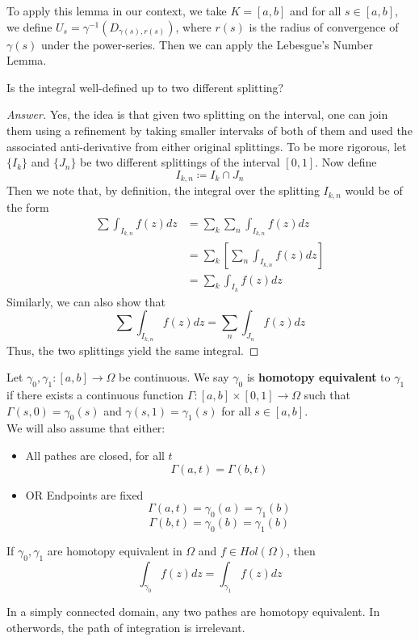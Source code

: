 To apply this lemma in our context, we take $K = [a, b]$ and for all $s \in [a, b]$, we define $U_s = \gamma^{-1}(D_{\gamma(s), r(s)})$, where $r(s)$ is the radius of convergence of $\gamma(s)$ under the power-series. Then we can apply the Lebesgue's Number Lemma.

\begin{question}
Is the integral well-defined up to two different splitting?
\end{question}

\begin{proof}[Answer]
Yes, the idea is that given two splitting on the interval, one can join them using a refinement by taking smaller intervaks of both of them and used the associated anti-derivative from either original splittings. To be more rigorous, let $\{I_k\}$ and $\{J_n\}$ be two different splittings of the interval $[0, 1]$. Now define
\[I_{k, n} \coloneqq I_k \cap J_n\]
Then we note that, by definition, the integral over the splitting $I_{k, n}$ would be of the form
\begin{align*}
    \sum \int_{I_{k, n}} f(z) dz &= \sum_{k} \sum_{n} \int_{I_{k, n}} f(z) dz\\
    &= \sum_k [\sum_{n} \int_{I_{k, n}} f(z) dz]\\
    &= \sum_k \int_{I_k} f(z) dz
\end{align*}
Similarly, we can also show that
\[\sum \int_{I_{k, n}} f(z) dz = \sum_n \int_{J_n} f(z) dz\]
Thus, the two splittings yield the same integral.
\end{proof}

\begin{definition}
    Let $\gamma_0, \gamma_1: [a, b] \to \Omega$ be continuous. We say $\gamma_0$ is \textbf{homotopy equivalent} to $\gamma_1$ if there exists a continuous function $\Gamma: [a, b] \times [0, 1] \to \Omega$ such that $\Gamma(s, 0) = \gamma_0(s)$ and $\gamma(s, 1) = \gamma_1(s)$ for all $s \in [a, b]$.\\
    We will also assume that either:
        \begin{itemize}
            \item All pathes are closed, for all $t$
            \[\Gamma(a, t) = \Gamma(b, t)\]
            \item OR Endpoints are fixed
            \[\Gamma(a, t) = \gamma_0(a) = \gamma_1(b)\]
            \[\Gamma(b, t) = \gamma_0(b) = \gamma_1(b)\]
        \end{itemize}
\end{definition}

\begin{theorem}
If $\gamma_0, \gamma_1$ are homotopy equivalent in $\Omega$ and $f \in Hol(\Omega)$, then
\[\int_{\gamma_0} f(z) dz = \int_{\gamma_1} f(z) dz\]
\end{theorem}

\begin{remark}
In a simply connected domain, any two pathes are homotopy equivalent. In otherwords, the path of integration is irrelevant.
\end{remark}